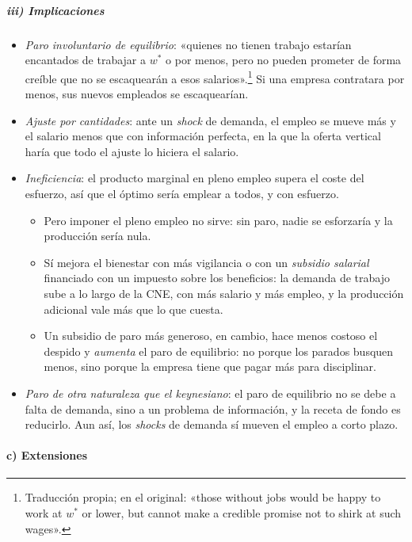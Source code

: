 \documentclass[11pt]{article}
\begin{document}
\subparagraph{iii) Implicaciones}

\begin{itemize}
\item \emph{Paro involuntario de equilibrio}: «quienes no tienen trabajo estarían encantados de trabajar a $w^*$ o por menos, pero no pueden prometer de forma creíble que no se escaquearán a esos salarios»\nocite{ShapiroStiglitz1984Equilibrium}.\footnote{Traducción propia; en el original: «those without jobs would be happy to work at $w^*$ or lower, but cannot make a credible promise not to shirk at such wages».} Si una empresa contratara por menos, sus nuevos empleados se escaquearían.
\item \emph{Ajuste por cantidades}: ante un \emph{shock} de demanda, el empleo se mueve más y el salario menos que con información perfecta, en la que la oferta vertical haría que todo el ajuste lo hiciera el salario.
\item \emph{Ineficiencia}: el producto marginal en pleno empleo supera el coste del esfuerzo, así que el óptimo sería emplear a todos, y con esfuerzo.
  \begin{itemize}
  \item Pero imponer el pleno empleo no sirve: sin paro, nadie se esforzaría y la producción sería nula.
  \item Sí mejora el bienestar con más vigilancia o con un \emph{subsidio salarial} financiado con un impuesto sobre los beneficios: la demanda de trabajo sube a lo largo de la CNE, con más salario y más empleo, y la producción adicional vale más que lo que cuesta\nocite{ShapiroStiglitz1984Equilibrium}.
  \item Un subsidio de paro más generoso, en cambio, hace menos costoso el despido y \emph{aumenta} el paro de equilibrio: no porque los parados busquen menos, sino porque la empresa tiene que pagar más para disciplinar.
  \end{itemize}
\item \emph{Paro de otra naturaleza que el keynesiano}: el paro de equilibrio no se debe a falta de demanda, sino a un problema de información, y la receta de fondo es reducirlo. Aun así, los \emph{shocks} de demanda sí mueven el empleo a corto plazo.
\end{itemize}

\paragraph{c) Extensiones}
\end{document}

